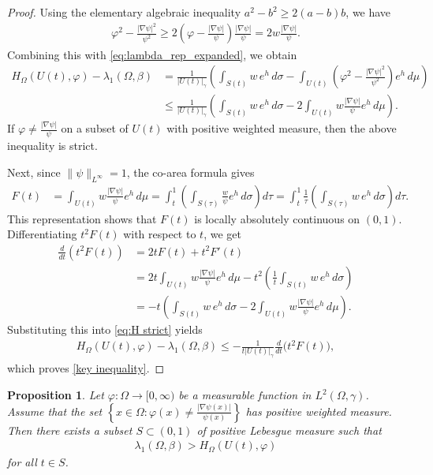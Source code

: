 \documentclass[11pt,leqno]{amsart}
\newtheorem{prop}{Proposition}[section]
\numberwithin{equation}{section}
\begin{document}
\begin{proof}
Using the elementary algebraic inequality $a^2 - b^2 \ge 2(a-b)b$, we have
\begin{align*}
\varphi^2 - \frac{|\nabla\psi|^{2}}{\psi^{2}} \ge 2 \left(\varphi - \frac{|\nabla\psi|}{\psi}\right)\frac{|\nabla\psi|}{\psi} = 2w \frac{|\nabla\psi|}{\psi}.
\end{align*}
Combining this with  \eqref{eq:lambda_rep_expanded}, we obtain
\begin{align}\label{eq:H strict}
    H_{\Omega}(U(t),\varphi) - \lambda_{1}(\Omega,\beta)
    &= \frac{1}{|U(t)|_\gamma}\left(\int_{S(t)}w \, e^{h}\,d\sigma - \int_{U(t)}\left(\varphi^{2}-\frac{|\nabla\psi|^{2}}{\psi^{2}}\right)e^{h}\,d\mu\right) \\
    &\leq \frac{1}{|U(t)|_\gamma}\left(\int_{S(t)}w \, e^{h}\,d\sigma - 2\int_{U(t)}w\frac{|\nabla \psi|}{\psi} e^{h}\,d\mu\right).\nonumber 
\end{align}
If $\varphi \neq \frac{|\nabla\psi|}{\psi}$ on a subset of $U(t)$ with positive weighted measure, then the above inequality is strict.

Next, since $\|\psi\|_{L^\infty} = 1$, the  co-area formula gives
\begin{align*}
    F(t) &= \int_{U(t)}w\frac{|\nabla \psi|}{\psi}e^{h}\,d\mu 
    = \int_{t}^{1}\left(\int_{S(\tau)}\frac{w}{\psi}e^{h}\,d\sigma\right)d\tau 
    = \int_{t}^{1}\frac{1}{\tau}\left(\int_{S(\tau)}w \, e^{h}\,d\sigma\right) d\tau.
\end{align*}
This representation shows that $F(t)$ is locally absolutely continuous on $(0,1)$. Differentiating $t^2 F(t)$ with respect to $t$, we get
\begin{align*}
    \frac{d}{dt}\left(t^{2}F(t)\right) &= 2tF(t) + t^{2}F'(t) \\
    &= 2t\int_{U(t)}w\frac{|\nabla\psi|}{\psi}e^{h}\,d\mu - t^{2}\left(\frac{1}{t}\int_{S(t)}w \, e^{h}\,d\sigma\right) \\
    &= -t\left(\int_{S(t)}w \, e^{h}\,d\sigma - 2\int_{U(t)}w\frac{|\nabla \psi|}{\psi}e^{h}\,d\mu\right).
\end{align*}
Substituting this  into \eqref{eq:H strict} yields
\begin{align*}
    H_{\Omega}(U(t),\varphi) - \lambda_{1}(\Omega,\beta) \leq -\frac{1}{t|U(t)|_\gamma}\frac{d}{dt}\big(t^{2}F(t)\big),
\end{align*}
which proves \eqref{key inequality}.
\end{proof}

\begin{prop}\label{lambda low bound}
Let $\varphi:\Omega\to [0,\infty)$ be a measurable function in $L^2(\Omega,\gamma)$. Assume that the set $\left\{x\in\Omega: \varphi(x)\neq \frac{|\nabla \psi(x)|}{\psi(x)}\right\}$ has positive weighted measure. Then there exists a subset $S\subset(0,1)$ of positive Lebesgue measure such that
\begin{align}\label{3.9}
    \lambda_{1}(\Omega,\beta) > H_{\Omega}(U(t),\varphi)
\end{align}
for all $t\in S$.
\end{prop}
\end{document}
